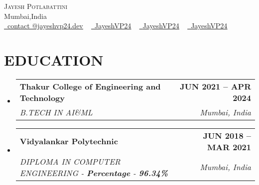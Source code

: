 \documentclass{article}
\makeatletter
\newcommand{\resumeSubheading}[4]{
  \vspace{-2pt}\item
    \begin{tabular*}{1.0\textwidth}[t]{l@{\extracolsep{\fill}}r}
      \textbf{\large#1} & \textbf{\small #2} \\
      \textit{\large#3} & \textit{\small #4} \\
      
    \end{tabular*}\vspace{-7pt}
}
\newcommand{\resumeSubHeadingListStart}{\begin{itemize}[leftmargin=0.0in, label={}]}
\newcommand{\resumeSubHeadingListEnd}{\end{itemize}}
\makeatother
\begin{document}


\begin{center}
    {\Huge \scshape Jayesh Potlabattini} \\ \vspace{1pt}
    Mumbai,India \\ \vspace{1pt}
    \href{mailto:me@jayeshvp24.dev}{\raisebox{-0.2\height}\faEnvelope\  \underline{contact  @jayeshvp24.dev}} ~ 
    \href{https://linkedin.com/in/JayeshVP24}{\raisebox{-0.2\height}\faLinkedinSquare\ \underline{JayeshVP24}}  ~
    \href{https://github.com/JayeshVP24}{\raisebox{-0.2\height}\faGithub\ \underline{JayeshVP24}} ~
     \href{https://twitter.com/JayeshVP24}{\raisebox{-0.2\height}\faTwitter\ \underline{JayeshVP24}}  ~
    \vspace{-8pt}
\end{center}


\section{EDUCATION}
  \resumeSubHeadingListStart
    \resumeSubheading
      {Thakur College of Engineering and Technology}{JUN 2021 -- APR 2024}
      {B.TECH IN AI\&ML }{Mumbai, India}
  \resumeSubHeadingListEnd
  \resumeSubHeadingListStart
    \resumeSubheading
      {Vidyalankar Polytechnic}{JUN 2018 -- MAR 2021}
      {DIPLOMA IN COMPUTER ENGINEERING  - \textbf{Percentage} - \textbf{96.34\%}}{Mumbai, India}
  \resumeSubHeadingListEnd

\end{document}
